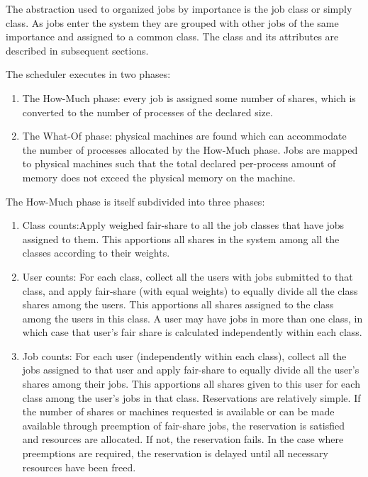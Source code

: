     The abstraction used to organized jobs by importance is the job class or simply class. As jobs enter 
    the system they are grouped with other jobs of the same importance and assigned to a common 
    class. The class and its attributes are described in subsequent sections. 
    
    The scheduler executes in two phases: 
    \begin{enumerate}
        \item The How-Much phase: every job is assigned some number of shares, which is converted to the
          number of processes of the declared size.
        \item The What-Of phase: physical machines are found which can accommodate the number of
          processes allocated by the How-Much phase. Jobs are mapped to physical machines such that
          the total declared per-process amount of memory does not exceed the physical memory on the
          machine.  
    \end{enumerate}
      
    The How-Much phase is itself subdivided into three phases:
    \begin{enumerate}
        \item Class counts:Apply weighed fair-share to all the job classes that have jobs assigned to
          them. This apportions all shares in the system among all the classes according to their
          weights.  

        \item User counts: For each class, collect all the users with jobs submitted to that
          class, and apply fair-share (with equal weights) to equally divide all the class shares among
          the users. This apportions all shares assigned to the class among the users in this class.  A
          user may have jobs in more than one class, in which case that user's fair share is calculated
          independently within each class.
          
        \item Job counts: For each user (independently within each class), collect all the jobs
          assigned to that user and apply fair-share to equally divide all the user's shares among
          their jobs. This apportions all shares given to this user for each class among the user's
          jobs in that class.  Reservations are relatively simple. If the number of shares or
          machines requested is available or can be made available through preemption of fair-share
          jobs, the reservation is satisfied and resources are allocated. If not, the reservation
          fails. In the case where preemptions are required, the reservation is delayed until all
          necessary resources have been freed.
    \end{enumerate}

